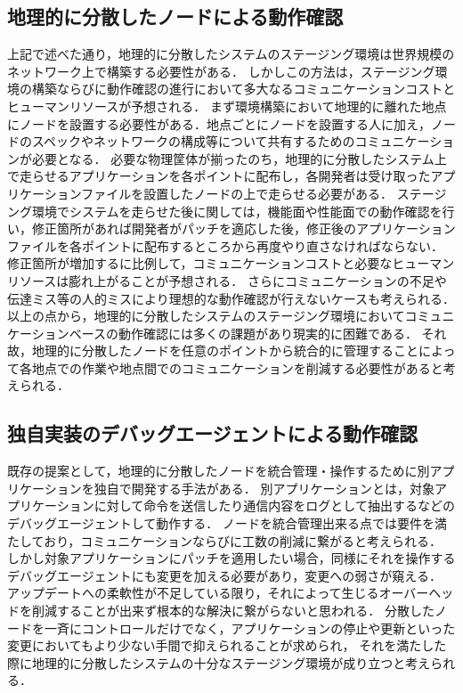 \subsection{地理的に分散したノードによる動作確認}
上記で述べた通り，地理的に分散したシステムのステージング環境は世界規模のネットワーク上で構築する必要性がある．
しかしこの方法は，ステージング環境の構築ならびに動作確認の進行において多大なるコミュニケーションコストとヒューマンリソースが予想される．
まず環境構築において地理的に離れた地点にノードを設置する必要性がある．地点ごとにノードを設置する人に加え，ノードのスペックやネットワークの構成等について共有するためのコミュニケーションが必要となる．
必要な物理筐体が揃ったのち，地理的に分散したシステム上で走らせるアプリケーションを各ポイントに配布し，各開発者は受け取ったアプリケーションファイルを設置したノードの上で走らせる必要がある．
ステージング環境でシステムを走らせた後に関しては，機能面や性能面での動作確認を行い，修正箇所があれば開発者がパッチを適応した後，修正後のアプリケーションファイルを各ポイントに配布するところから再度やり直さなければならない．
修正箇所が増加するに比例して，コミュニケーションコストと必要なヒューマンリソースは膨れ上がることが予想される．
さらにコミュニケーションの不足や伝達ミス等の人的ミスにより理想的な動作確認が行えないケースも考えられる．
以上の点から，地理的に分散したシステムのステージング環境においてコミュニケーションベースの動作確認には多くの課題があり現実的に困難である．
それ故，地理的に分散したノードを任意のポイントから統合的に管理することによって各地点での作業や地点間でのコミュニケーションを削減する必要性があると考えられる．

\subsection{独自実装のデバッグエージェントによる動作確認}
既存の提案として，地理的に分散したノードを統合管理・操作するために別アプリケーションを独自で開発する手法がある．
別アプリケーションとは，対象アプリケーションに対して命令を送信したり通信内容をログとして抽出するなどのデバッグエージェントして動作する．
ノードを統合管理出来る点では要件を満たしており，コミュニケーションならびに工数の削減に繋がると考えられる．
しかし対象アプリケーションにパッチを適用したい場合，同様にそれを操作するデバッグエージェントにも変更を加える必要があり，変更への弱さが窺える．
アップデートへの柔軟性が不足している限り，それによって生じるオーバーヘッドを削減することが出来ず根本的な解決に繋がらないと思われる．
分散したノードを一斉にコントロールだけでなく，アプリケーションの停止や更新といった変更においてもより少ない手間で抑えられることが求められ，
それを満たした際に地理的に分散したシステムの十分なステージング環境が成り立つと考えられる．

